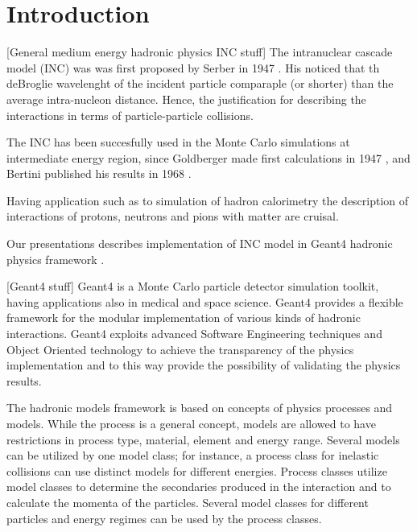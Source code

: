 \section{Introduction}

[General medium energy hadronic physics INC stuff]
The intranuclear cascade model (INC) was was first proposed by Serber in 1947 \cite{serber47}.  
His noticed that th deBroglie wavelenght of the incident particle comparaple (or shorter) than the average intra-nucleon distance.
Hence, the justification for describing the interactions in terms of particle-particle  collisions.

The INC has been succesfully used in the Monte Carlo simulations at intermediate energy region, 
since Goldberger made first calculations in 1947 \cite{goldberger48}, and   Bertini published his results in 1968 \cite{bertini68}.

Having application such as to simulation of hadron calorimetry the description of interactions of protons, neutrons and pions with matter are cruisal.

Our presentations describes implementation of INC model in {\sc Geant4} hadronic physics framework \cite{}.

[Geant4 stuff]
Geant4 is a Monte Carlo particle detector simulation toolkit, having applications also in  medical and space
science. 
Geant4 provides a flexible framework for the modular implementation of
various kinds of hadronic interactions. 
Geant4 exploits advanced Software Engineering techniques and Object
Oriented technology to achieve the transparency of the physics
implementation and to this way provide the possibility of validating the
physics results. 

The hadronic models framework is based on concepts of physics
processes and models. While the process is a general concept, models
are allowed to have restrictions in process type, material, element
and energy range.  Several models can be utilized by one model class; for instance, a
process class for inelastic collisions can use distinct models for different energies.
Process classes utilize model classes to determine the
secondaries produced in the interaction and to calculate the momenta
of the particles.  Several model classes for different particles and
energy regimes can be used by the process classes.




